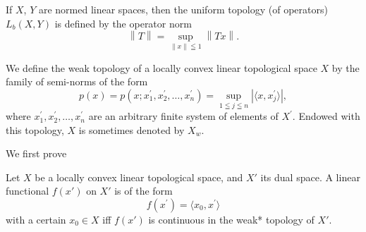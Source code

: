 \begin{theorem}\label{thm:IV.7.Theorem.2} If $X$, $Y$ are normed linear spaces, then the uniform topology (of operators) $L_{b}(X, Y)$ is defined by the operator norm 
\[
\left\| T \right\| = \sup\limits _{\left\| x \right\| \leqq 1} \left\| T x \right\|.
\]
\end{theorem}

\begin{definition}\label{def:IV.7.Definition.3} We define the weak topology of a locally convex linear topological space $X$ by the family of semi-norms of the form 
\[
p (x) = p \left(x; x _{1} ^{\prime}, x _{2} ^{\prime}, \dots , x _{n} ^{\prime}\right) = \sup\limits _{1 \leqq j \leqq n} | \langle x, x _{j} ^{\prime} \rangle |,
\]
where $x_{1}^{\prime}, x_{2}^{\prime}, \ldots, x_{n}^{\prime}$ are an arbitrary finite system of elements of $X^{\prime}$. Endowed with this topology, $X$ is sometimes denoted by $X_{w}$. 
\end{definition}


\label{sec:IV.8}

We first prove 

\begin{theorem}\label{thm:IV.8.Theorem.1} Let $X$ be a locally convex linear topological space, and $X'$ its dual space. A linear functional $f(x')$ on $X'$ is of the form 
\[
f (x ^{\prime}) = \langle x _{0}, x ^{\prime} \rangle
\]
with a certain $x_0 \in X$ iff $f(x')$ is continuous in the weak* topology of $X'$. 
\end{theorem}

